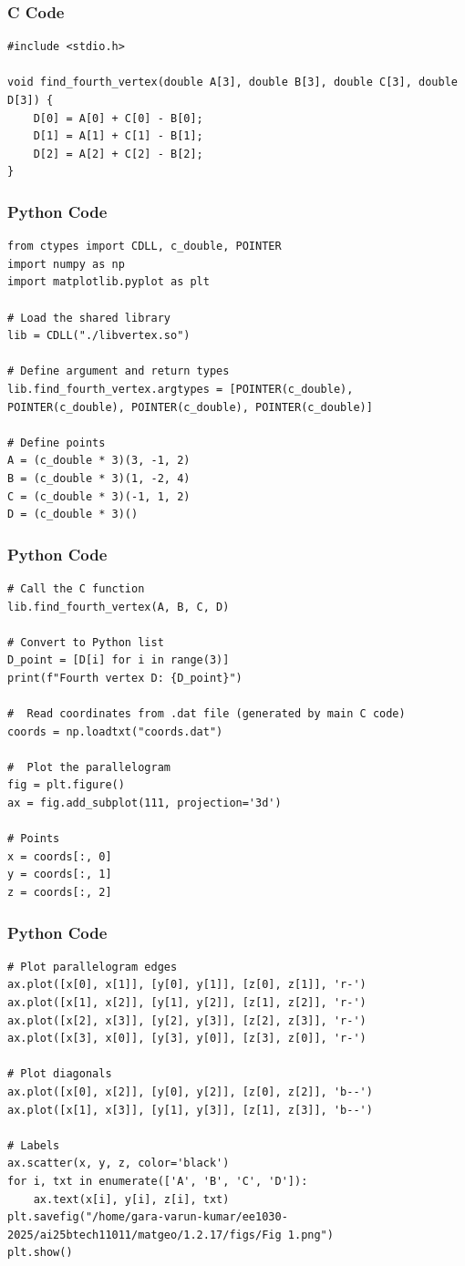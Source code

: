 \documentclass{beamer}
\begin{document}
\begin{frame}[fragile]
    \frametitle{C Code}

    \begin{lstlisting}
#include <stdio.h>

void find_fourth_vertex(double A[3], double B[3], double C[3], double D[3]) {
    D[0] = A[0] + C[0] - B[0];
    D[1] = A[1] + C[1] - B[1];
    D[2] = A[2] + C[2] - B[2];
}
    \end{lstlisting}
\end{frame}
\begin{frame}[fragile]
    \frametitle{Python Code}
    \begin{lstlisting}
from ctypes import CDLL, c_double, POINTER
import numpy as np
import matplotlib.pyplot as plt

# Load the shared library
lib = CDLL("./libvertex.so")

# Define argument and return types
lib.find_fourth_vertex.argtypes = [POINTER(c_double), POINTER(c_double), POINTER(c_double), POINTER(c_double)]

# Define points
A = (c_double * 3)(3, -1, 2)
B = (c_double * 3)(1, -2, 4)
C = (c_double * 3)(-1, 1, 2)
D = (c_double * 3)()
    \end{lstlisting}
\end{frame}

\begin{frame}[fragile]
    \frametitle{Python Code}
    \begin{lstlisting}
# Call the C function
lib.find_fourth_vertex(A, B, C, D)

# Convert to Python list
D_point = [D[i] for i in range(3)]
print(f"Fourth vertex D: {D_point}")

#  Read coordinates from .dat file (generated by main C code)
coords = np.loadtxt("coords.dat")

#  Plot the parallelogram
fig = plt.figure()
ax = fig.add_subplot(111, projection='3d')

# Points
x = coords[:, 0]
y = coords[:, 1]
z = coords[:, 2]
    \end{lstlisting}
\end{frame}

\begin{frame}[fragile]
    \frametitle{Python Code}
    \begin{lstlisting}
# Plot parallelogram edges
ax.plot([x[0], x[1]], [y[0], y[1]], [z[0], z[1]], 'r-')
ax.plot([x[1], x[2]], [y[1], y[2]], [z[1], z[2]], 'r-')
ax.plot([x[2], x[3]], [y[2], y[3]], [z[2], z[3]], 'r-')
ax.plot([x[3], x[0]], [y[3], y[0]], [z[3], z[0]], 'r-')

# Plot diagonals
ax.plot([x[0], x[2]], [y[0], y[2]], [z[0], z[2]], 'b--')
ax.plot([x[1], x[3]], [y[1], y[3]], [z[1], z[3]], 'b--')

# Labels
ax.scatter(x, y, z, color='black')
for i, txt in enumerate(['A', 'B', 'C', 'D']):
    ax.text(x[i], y[i], z[i], txt)
plt.savefig("/home/gara-varun-kumar/ee1030-2025/ai25btech11011/matgeo/1.2.17/figs/Fig 1.png")
plt.show()
    \end{lstlisting}
\end{frame}
\end{document}
